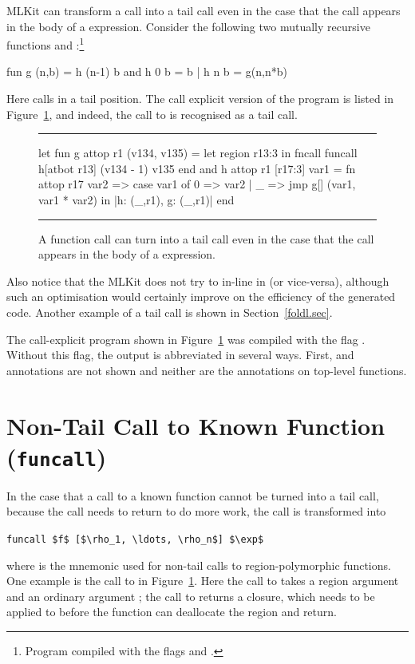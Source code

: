 \documentclass[12pt]{book}
\begin{document}
MLKit can transform a call into a  tail call even in the case that
the call appears in the body of a  expression.  Consider the following
two mutually recursive functions  and :\footnote{Program
 compiled with the flags  and
.}
\begin{smlcode}
  fun g (n,b) = h (n-1) b
  and h 0 b = b
    | h n b = g(n,n*b)
\end{smlcode}
Here  calls  in a tail position. The call explicit version of the
program is listed in Figure~\ref{tail2.fig}, and indeed, the call to  is
recognised as a tail call.
\begin{figure}
\hrule \medskip
\begin{smlcode}
   let fun g attop r1 (v134, v135) =
           let region r13:3
           in  fncall funcall h[atbot r13] (v134 - 1) v135
           end
       and h attop r1 [r17:3] var1 =
           fn attop r17 var2 =>
           case var1 of 0 => var2 | _ => jmp g[] (var1, var1 * var2)
   in  {|h: (_,r1), g: (_,r1)|}
   end
\end{smlcode}
\caption{A function call can turn into a tail call even
  in the case that the call appears in the body of a  expression.}
\medskip \hrule
\label{tail2.fig}
\end{figure}
Also notice that the MLKit does not try to in-line  in  (or
vice-versa), although such an optimisation would certainly improve on the
efficiency of the generated code. Another example of a  tail call is
shown in Section~\ref{foldl.sec}.

The call-explicit program shown in Figure~\ref{tail2.fig} was compiled with the
flag . Without this flag, the output is abbreviated in several
ways. First,  and  annotations are not shown and neither
are the   annotations on top-level functions.

\section{Non-Tail Call to Known Function (\texttt{funcall})}

In the case that a call to a known function cannot be turned into a
tail call, because the call needs to return to do more work, the call
is transformed into
\begin{center}
  \lstinline!funcall $f$ [$\rho_1, \ldots, \rho_n$] $\exp$!
\end{center}
where  is the mnemonic used for non-tail calls to region-polymorphic
functions. One example is the call to  in Figure~\ref{tail2.fig}. Here the
call to  takes a region argument  and an ordinary argument
; the call to  returns a closure, which needs to be applied
to  before the function  can deallocate the region  and
return.
\end{document}
